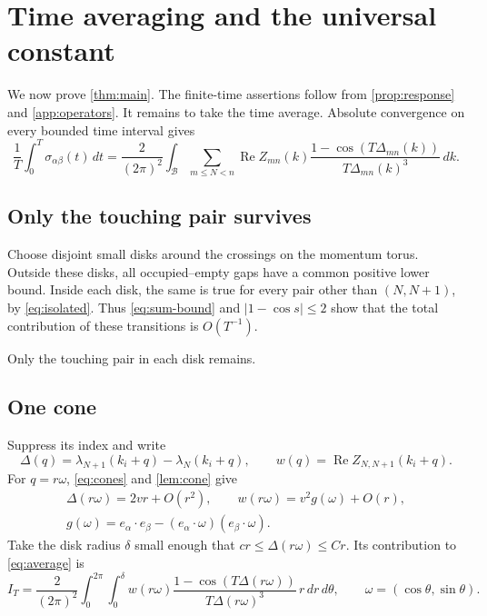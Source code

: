 \documentclass[11pt,a4paper]{article}
\DeclareMathOperator{\Rea}{Re}
\theoremstyle{remark}
\numberwithin{equation}{section}
\begin{document}
\section{Time averaging and the universal constant}\label{sec:limit}

We now prove \cref{thm:main}. The finite-time assertions follow from
\cref{prop:response} and \cref{app:operators}. It remains to take the
time average. Absolute convergence on every bounded time interval gives
\begin{equation}\label{eq:average}
 \frac1T\int_0^T\sigma_{\alpha\beta}(t)\,dt
 =\frac{2}{(2\pi)^2}\int_{\mathcal B}\sum_{m\le N<n}
 \Rea Z_{mn}(k)
 \frac{1-\cos(T\Delta_{mn}(k))}{T\Delta_{mn}(k)^3}\,dk.
\end{equation}

\subsection{Only the touching pair survives}

Choose disjoint small disks around the crossings on the momentum
torus. Outside these disks, all occupied--empty gaps have a common
positive lower bound. Inside each disk, the same is true for every
pair other than $(N,N+1)$, by \eqref{eq:isolated}. Thus
\eqref{eq:sum-bound} and $|1-\cos s|\le2$ show that the total
contribution of these transitions is $O(T^{-1})$.

Only the touching pair in each disk remains.

\subsection{One cone}

Suppress its index and write
\[
 \Delta(q)=\lambda_{N+1}(k_i+q)-\lambda_N(k_i+q),\qquad
 w(q)=\Rea Z_{N,N+1}(k_i+q).
\]
For $q=r\omega$, \eqref{eq:cones} and \cref{lem:cone} give
\begin{equation}\label{eq:local-data}
 \begin{gathered}
 \Delta(r\omega)=2vr+O(r^2),\qquad
 w(r\omega)=v^2g(\omega)+O(r),\\
 g(\omega)=e_\alpha\cdot e_\beta
       -(e_\alpha\cdot\omega)(e_\beta\cdot\omega).
 \end{gathered}
\end{equation}
Take the disk radius $\delta$ small enough that $cr\le\Delta(r\omega)
\le Cr$. Its contribution to \eqref{eq:average} is
\begin{equation}\label{eq:one-cone}
 I_T=\frac{2}{(2\pi)^2}\int_0^{2\pi}\int_0^\delta
 w(r\omega)\frac{1-\cos(T\Delta(r\omega))}
                   {T\Delta(r\omega)^3}\,r\,dr\,d\theta,
 \qquad \omega=(\cos\theta,\sin\theta).
\end{equation}
\end{document}
